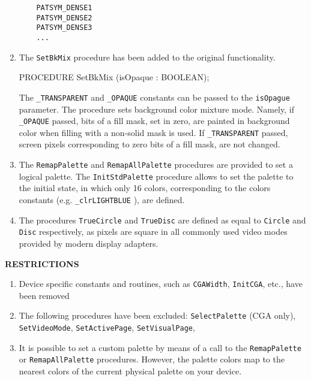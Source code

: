 \begin{enumerate}
\begin{verbatim}
    PATSYM_DENSE1
    PATSYM_DENSE2
    PATSYM_DENSE3
    ...
\end{verbatim}

\item The \verb'SetBkMix' procedure has been added to the original functionality.

          PROCEDURE SetBkMix (isOpaque : BOOLEAN);

      The \verb'_TRANSPARENT' and \verb'_OPAQUE' constants can be passed to the
      \verb'isOpague' parameter.
      The procedure sets background color mixture mode. Namely, if \verb'_OPAQUE'
      passed, bits of a fill mask, set in zero, are painted in background color
      when filling with a non-solid mask is used. If \verb'_TRANSPARENT' passed,
      screen pixels corresponding to zero bits of a fill mask, are not
      changed.

\item The \verb'RemapPalette' and \verb'RemapAllPalette' procedures are provided to set
      a logical palette. The \verb'InitStdPalette' procedure allows to set
      the palette to the initial state, in which only 16 colors, corresponding
      to the colors constants (e.g. \verb'_clrLIGHTBLUE' ), are defined.

\item The procedures \verb'TrueCircle' and \verb'TrueDisc' are defined as equal
      to \verb'Circle' and \verb'Disc' respectively, as pixels are square
      in all commonly used video modes provided by modern display adapters.
\end{enumerate}

{\bf RESTRICTIONS}

\begin{enumerate}
\item Device specific constants and routines, such as \verb'CGAWidth',
      \verb'InitCGA', etc., have been removed

\item The following procedures have been excluded:
      \verb'SelectPalette' (CGA only),
      \verb'SetVideoMode',
      \verb'SetActivePage',
      \verb'SetVisualPage',

\item It is possible to set a custom palette by means of a call to the
      \verb'RemapPalette' or \verb'RemapAllPalette' procedures. However,
      the palette colors map to the nearest colors of the current physical
      palette on your device.
\end{enumerate}


